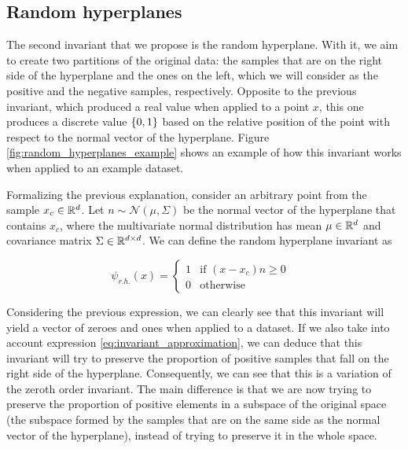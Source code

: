 \subsection{Random hyperplanes}

The second invariant that we propose is the random hyperplane. With it, we aim to create two partitions of
the original data: the samples that are on the right side of the hyperplane and the ones on the left, which
we will consider as the positive and the negative samples, respectively. Opposite to the previous invariant, which
produced a real value when applied to a point $x$, this one produces a discrete value $\lbrace 0, 1 \rbrace$ based on the
relative position of the point with respect to the normal vector of the hyperplane.
Figure \ref{fig:random_hyperplanes_example} shows an example of how this invariant works when applied to
an example dataset.

Formalizing the previous explanation, consider an arbitrary point from the sample $x_c \in \mathbb{R}^{d}$. Let
$n \sim \mathcal{N}(\mu, \Sigma)$ be the normal vector of the hyperplane that contains $x_c$, where the
multivariate normal distribution has mean $\mu \in \mathbb{R}^{d}$ and covariance matrix $\Sigma \in \mathbb{R}^{d \times d}$.
We can define the random hyperplane invariant as

\begin{equation}
    \label{eq:random_hyperplane_invariant}
    \psi_{r.h.}(x) =
    \begin{cases}
        1 & \text{if $(x - x_c)n \geq 0$ }\\
        0 & \text{otherwise}
    \end{cases}
\end{equation}

Considering the previous expression, we can clearly see that this invariant will yield a vector of zeroes
and ones when applied to a dataset. If we also take into account expression \eqref{eq:invariant_approximation},
we can deduce that this invariant will try to preserve the proportion of positive samples that fall on the right
side of the hyperplane. Consequently, we can see that this is a variation of the zeroth order invariant.
The main difference is that we are now trying to preserve the proportion of positive elements in a subspace
of the original space (the subspace formed by the samples that are on the same side as the normal vector of the
hyperplane), instead of trying to preserve it in the whole space.

